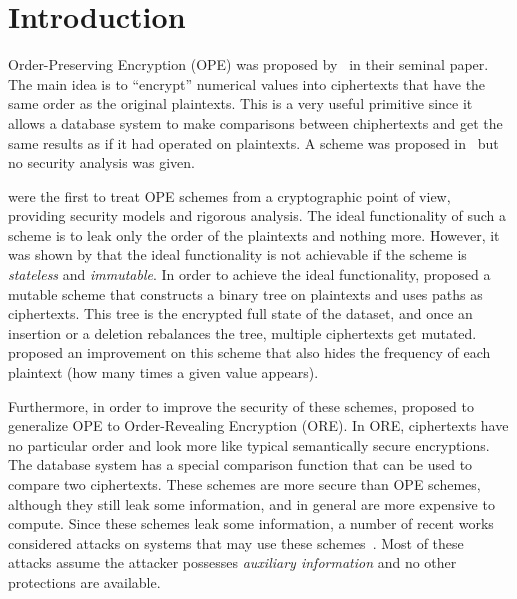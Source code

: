 \section{Introduction}

	Order-Preserving Encryption (OPE) was proposed by~\textcite{ope-original} in their seminal paper.
	The main idea is to ``encrypt'' numerical values into ciphertexts that have the same order as the original plaintexts.
	This is a very useful primitive since it allows a database system to make comparisons between chiphertexts and get the same results as if it had operated on plaintexts.
	A scheme was proposed in~\cite{ope-original} but no security analysis was given.

	\textcite{bclo-ope} were the first to treat OPE schemes from a cryptographic point of view, providing security models and rigorous analysis.
	The ideal functionality of such a scheme is to leak only the order of the plaintexts and nothing more.
	However, it was shown by \textcite{bclo-ope} that the ideal functionality is not achievable if the scheme is \emph{stateless} and \emph{immutable}.
	In order to achieve the ideal functionality, \textcite{ope-ideal-security-protocol} proposed a mutable scheme that constructs a binary tree on plaintexts and uses paths as ciphertexts.
	This tree is the encrypted full state of the dataset, and once an insertion or a deletion rebalances the tree, multiple ciphertexts get mutated.
	\textcite{fh-ope} proposed an improvement on this scheme that also hides the frequency of each plaintext (how many times a given value appears).

	Furthermore, in order to improve the security of these schemes, \textcite{ore-original} proposed to generalize OPE to Order\hyp{}Revealing Encryption (ORE).
	In ORE, ciphertexts have no particular order and look more like typical semantically secure encryptions.
	The database system has a special comparison function that can be used to compare two ciphertexts.
	These schemes are more secure than OPE schemes, although they still leak some information, and in general are more expensive to compute.
	Since these schemes leak some information, a number of recent works considered attacks on systems that may use these schemes~\cite{access-pattern-disclosure, inference-attack-islam-14, inference-attacks-naveed-15, grubbs-attacks, generic-attacks-kellaris, leakage-abuse-attacks-cash-15, attacks-what-else-revealed, attacks-improved-reconstruction, attacks-tao-of-inference, attacks-ore-injection}.
	Most of these attacks assume the attacker possesses \emph{auxiliary information} and no other protections are available.

